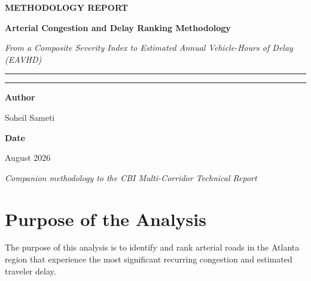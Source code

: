 \documentclass[11pt]{article}
\begin{document}
\begin{titlepage}
\thispagestyle{empty}
\centering
\vspace*{0.18\textheight}

{\large\bfseries METHODOLOGY REPORT\par}
\vspace{1.35cm}

{\color{blue!35!black}\Huge\bfseries Arterial Congestion and Delay Ranking Methodology\par}
\vspace{0.55cm}

{\color{blue!55!black}\large\itshape From a Composite Severity Index to Estimated Annual Vehicle-Hours of Delay (EAVHD)\par}
\vspace{0.8cm}

{\color{blue!45!black}\rule{0.88\textwidth}{0.8pt}\par}
\vspace{0.75cm}
{\color{blue!45!black}\rule{0.88\textwidth}{0.8pt}\par}

\vspace{1.55cm}

{\bfseries Author\par}
\vspace{0.12cm}
{Soheil Sameti\par}

\vspace{0.75cm}

{\bfseries Date\par}
\vspace{0.12cm}
{August 2026\par}

\vfill

{\itshape\small Companion methodology to the CBI Multi-Corridor Technical Report\par}
\vspace{1.6cm}
\end{titlepage}

\tableofcontents
\newpage

\section{Purpose of the Analysis}

The purpose of this analysis is to identify and rank arterial roads in the Atlanta region that experience the most significant recurring congestion and estimated traveler delay.
\end{document}
